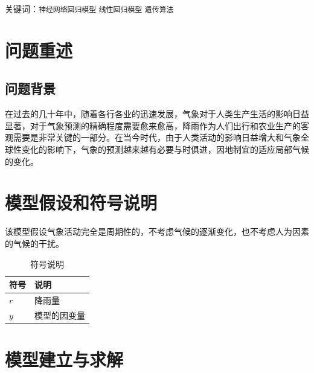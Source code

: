 \documentclass[UTF8, a4paper]{ctexart}
\begin{document}
关键词：\texttt{神经网络回归模型}  \texttt{线性回归模型}  \texttt{遗传算法}

\newpage

\section{问题重述}

\subsection{问题背景}

在过去的几十年中，随着各行各业的迅速发展，气象对于人类生产生活的影响日益显著，对于气象预测的精确程度需要愈来愈高，降雨作为人们出行和农业生产的客观需要是非常关键的一部分。在当今时代，由于人类活动的影响日益增大和气象全球性变化的影响下，气象的预测越来越有必要与时俱进，因地制宜的适应局部气候的变化。


\section{模型假设和符号说明}

该模型假设气象活动完全是周期性的，不考虑气候的逐渐变化，也不考虑人为因素的气候的干扰。

\begin{table}[h]
	\centering
	\caption{符号说明}
	\begin{tabular}{p{6em}l}
		\hline
		符号  & 说明     \\
		\hline
		$r$ & 降雨量    \\
		$y$ & 模型的因变量 \\
		\hline
	\end{tabular}
\end{table}

\section{模型建立与求解}
\end{document}
